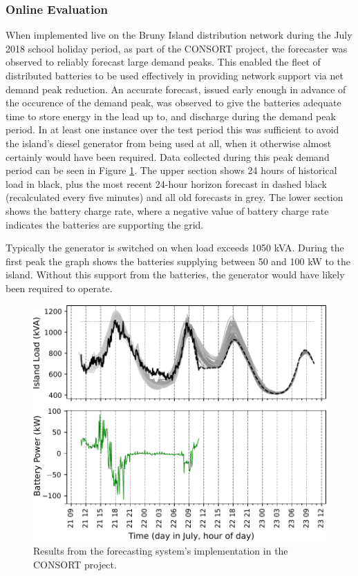 \subsubsection{Online Evaluation}
When implemented live on the Bruny Island distribution network during the July 2018 school holiday period, as part of the CONSORT project, the forecaster was observed to reliably forecast large demand peaks.
This enabled the fleet of distributed batteries to be used effectively in providing network support via net demand peak reduction. An accurate forecast, issued early enough in advance of the occurence of the demand peak, was observed to give the batteries adequate time to store energy in the lead up to, and discharge during the demand peak period. In at least one instance over the test period this was sufficient to avoid the island's diesel generator from being used at all, when it otherwise almost certainly would have been required.
Data collected during this peak demand period can be seen in Figure \ref{fig:bruny_nac}.
The upper section shows 24 hours of historical load in black, plus the most recent 24-hour horizon forecast in dashed black (recalculated every five minutes) and all old forecasts in grey.
The lower section shows the battery charge rate, where a negative value of battery charge rate indicates the batteries are supporting the grid.

Typically the generator is switched on when load exceeds 1050 kVA.
During the first peak the graph shows the batteries supplying between 50 and 100 kW to the island.
Without this support from the batteries, the generator would have likely been required to operate.

\begin{figure}[htbp]
	\centerline{\includegraphics[width=.75\textwidth]{images/bruny_nac.pdf}}
	\caption{Results from the forecasting system's implementation in the CONSORT project.}
	\label{fig:bruny_nac}
\end{figure}


